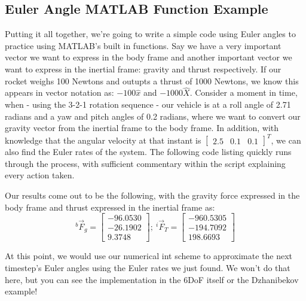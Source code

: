 \documentclass[12pt]{report}
\begin{document}
\subsection{Euler Angle MATLAB Function Example}\label{sec:EulerDynamicsMATLABExample}

Putting it all together, we're going to write a simple code using \gls{Euler angles} to practice using MATLAB's built in functions. Say we have a very important vector we want to express in the \gls{body frame} and another important vector we want to express in the \gls{inertial frame}: gravity and thrust respectively. If our rocket weighs 100 Newtons and outupts a thrust of 1000 Newtons, we know this appears in vector notation as: $-100\hat{x}$ and $-1000\hat{X}$. Consider a moment in time, when - using the 3-2-1 rotation sequence - our vehicle is at a roll angle of 2.71 radians and a yaw and pitch angles of 0.2 radians, where we want to convert our gravity vector from the \gls{inertial frame} to the \gls{body frame}. In addition, with knowledge that the angular velocity at that instant is $\begin{bmatrix}
    2.5&0.1&0.1
\end{bmatrix}^T$, we can also find the \gls{Euler rates} of the system. The following code listing quickly runs through the process, with sufficient commentary within the script explaining every \gls{action} taken.

\lstset{style=mystyle}

\label{Euler Dynamics Listing}

Our results come out to be the following, with the gravity force expressed in the \gls{body frame} and thrust expressed in the \gls{inertial frame} as:
\begin{equation}
    ^b\vec{F}_{g}=\begin{bmatrix}
        -96.0530\\-26.1902\\9.3748
    \end{bmatrix};\ ^i\vec{F}_{T}=\begin{bmatrix}
        -960.5305\\-194.7092\\198.6693
    \end{bmatrix}
\end{equation}

At this point, we would use our \gls{numerical int} scheme to approximate the next timestep's \gls{Euler angles} using the \gls{Euler rates} we just found. We won't do that here, but you can see the implementation in the 6DoF itself or the Dzhanibekov example!
\end{document}
